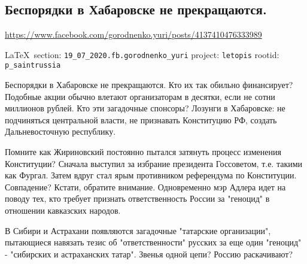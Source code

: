  
 

\subsection{Беспорядки в Хабаровске не прекращаются.}
\label{sec:19_07_2020.fb.gorodnenko_yuri}
\url{https://www.facebook.com/gorodnenko.yuri/posts/4137410476333989}
  
\vspace{0.5cm}
{\small\LaTeX~section: \verb|19_07_2020.fb.gorodnenko_yuri| project: \verb|letopis| rootid: \verb|p_saintrussia|}
\vspace{0.5cm}

Беспорядки в Хабаровске не прекращаются. Кто их так обильно финансирует?
Подобные акции обычно влетают организаторам в десятки, если не сотни миллионов
рублей. Кто эти загадочные спонсоры?  Лозунги в Хабаровске: не подчиняться
центральной власти, не признавать Конституцию РФ, создать Дальневосточную
республику.

Помните как Жириновский постоянно пытался затянуть процесс изменения
Конституции? Сначала выступил за избрание президента Госсоветом, т.е. такими
как Фургал.  Затем вдруг стал ярым противником референдума по Конституции.
Совпадение?  Кстати, обратите внимание. Одновременно мэр Адлера идет на поводу
тех, кто требует признать ответственность России за "геноцид" в отношении
кавказских народов.

В Сибири и Астрахани появляются загадочные "татарские организации", пытающиеся
навязать тезис об "ответственности" русских за еще один "геноцид" - "сибирских
и астраханских татар".  Звенья одной цепи? Россию раскачивают?
  
